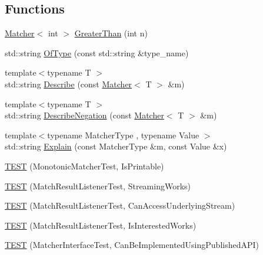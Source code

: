 \subsection*{Functions}
\begin{DoxyCompactItemize}
\item 
\mbox{\hyperlink{classtesting_1_1Matcher}{Matcher}}$<$ int $>$ \mbox{\hyperlink{namespacetesting_1_1gmock__matchers__test_a8cf8614a7c9adc8fb00e8af04895f97c}{Greater\+Than}} (int n)
\item 
std\+::string \mbox{\hyperlink{namespacetesting_1_1gmock__matchers__test_aea4c2446402f87073f8fec944fc1113c}{Of\+Type}} (const std\+::string \&type\+\_\+name)
\item 
{\footnotesize template$<$typename T $>$ }\\std\+::string \mbox{\hyperlink{namespacetesting_1_1gmock__matchers__test_a738a538e1705ea49670aeb3ed25108e6}{Describe}} (const \mbox{\hyperlink{classtesting_1_1Matcher}{Matcher}}$<$ T $>$ \&m)
\item 
{\footnotesize template$<$typename T $>$ }\\std\+::string \mbox{\hyperlink{namespacetesting_1_1gmock__matchers__test_a96c18b92dede79060a7303fe5d178faf}{Describe\+Negation}} (const \mbox{\hyperlink{classtesting_1_1Matcher}{Matcher}}$<$ T $>$ \&m)
\item 
{\footnotesize template$<$typename Matcher\+Type , typename Value $>$ }\\std\+::string \mbox{\hyperlink{namespacetesting_1_1gmock__matchers__test_a54e38d7df891801181af4c2acc38c3d5}{Explain}} (const Matcher\+Type \&m, const Value \&x)
\item 
\mbox{\hyperlink{namespacetesting_1_1gmock__matchers__test_a4bfc098c6e9ca2766a3dc8f149f62492}{T\+E\+ST}} (Monotonic\+Matcher\+Test, Is\+Printable)
\item 
\mbox{\hyperlink{namespacetesting_1_1gmock__matchers__test_a7bc21ec910c3861034d1336fecfcc260}{T\+E\+ST}} (Match\+Result\+Listener\+Test, Streaming\+Works)
\item 
\mbox{\hyperlink{namespacetesting_1_1gmock__matchers__test_abc02b215e80c57464c83abdf297b9db7}{T\+E\+ST}} (Match\+Result\+Listener\+Test, Can\+Access\+Underlying\+Stream)
\item 
\mbox{\hyperlink{namespacetesting_1_1gmock__matchers__test_ac7ee3826ca24c20fa2a8b388c72eedb2}{T\+E\+ST}} (Match\+Result\+Listener\+Test, Is\+Interested\+Works)
\item 
\mbox{\hyperlink{namespacetesting_1_1gmock__matchers__test_a2d73acaddb6b28a827ce0e475ffc9cde}{T\+E\+ST}} (Matcher\+Interface\+Test, Can\+Be\+Implemented\+Using\+Published\+A\+PI)

\end{DoxyCompactItemize}
